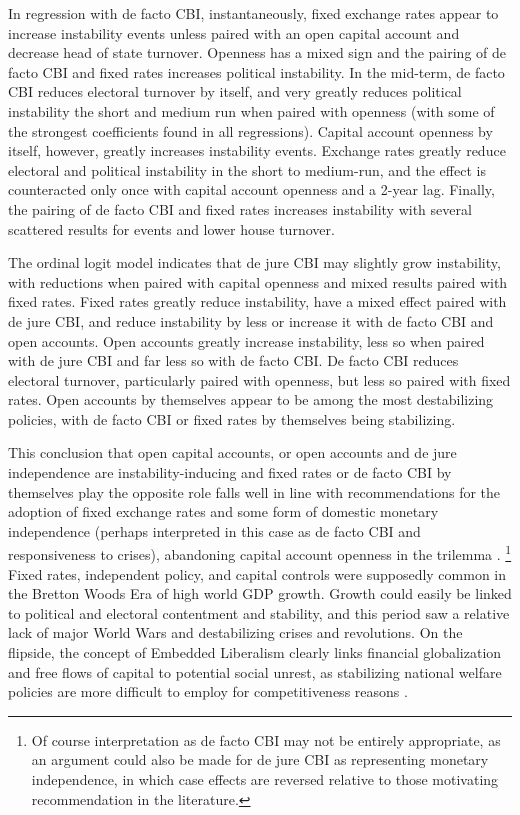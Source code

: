 \documentclass{article}
\begin{document}
    In regression with de facto CBI, instantaneously, fixed exchange rates appear to increase instability events unless paired with an open capital account and decrease head of state turnover. Openness has a mixed sign and the pairing of de facto CBI and fixed rates increases political instability. In the mid-term, de facto CBI reduces electoral turnover by itself, and very greatly reduces political instability the short and medium run when paired with openness (with some of the strongest coefficients found in all regressions). Capital account openness by itself, however, greatly increases instability events. Exchange rates greatly reduce electoral and political instability in the short to medium-run, and the effect is counteracted only once with capital account openness and a 2-year lag. Finally, the pairing of de facto CBI and fixed rates increases instability with several scattered results for events and lower house turnover.

    The ordinal logit model indicates that de jure CBI may slightly grow instability, with reductions when paired with capital openness and mixed results paired with fixed rates. Fixed rates greatly reduce instability, have a mixed effect paired with de jure CBI, and reduce instability by less or increase it with de facto CBI and open accounts. Open accounts greatly increase instability, less so when paired with de jure CBI and far less so with de facto CBI. De facto CBI reduces electoral turnover, particularly paired with openness, but less so paired with fixed rates. Open accounts by themselves appear to be among the most destabilizing policies, with de facto CBI or fixed rates by themselves being stabilizing.

    This conclusion that open capital accounts, or open accounts and de jure independence are instability-inducing and fixed rates or de facto CBI by themselves play the opposite role falls well in line with recommendations for the adoption of fixed exchange rates and some form of domestic monetary independence (perhaps interpreted in this case as de facto CBI and responsiveness to crises), abandoning capital account openness in the trilemma \citep{rodrik_globalization_2011}. \footnote{Of course interpretation as de facto CBI may not be entirely appropriate, as an argument could also be made for de jure CBI as representing monetary independence, in which case effects are reversed relative to those motivating recommendation in the literature.} Fixed rates, independent policy, and capital controls were supposedly common in the Bretton Woods Era of high world GDP growth. Growth could easily be linked to political and electoral contentment and stability, and this period saw a relative lack of major World Wars and destabilizing crises and revolutions. On the flipside, the concept of Embedded Liberalism clearly links financial globalization and free flows of capital to potential social unrest, as stabilizing national welfare policies are more difficult to employ for competitiveness reasons \citep{ruggie_international_1982}.
\end{document}
